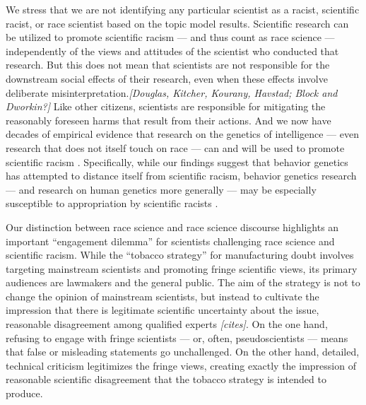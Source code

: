 \documentclass[12pt]{article}
\begin{document}
We stress that we are not identifying any particular scientist as a racist, scientific racist, or race scientist based on the topic model results. Scientific research can be utilized to promote scientific racism --- and thus count as race science --- independently of the views and attitudes of the scientist who conducted that research.\cite{TaberyWhyStudyingGenetics2015, GillbornSoftlySoftlyGenetics2016, CarlsonQuantifyingContextualizingImpact2020, HennWhyDNANo2021} But this does not mean that scientists are not responsible for the downstream social effects of their
research, even when these effects involve deliberate misinterpretation.\emph{{[}Douglas, Kitcher, Kourany, Havstad; Block and Dworkin?{]}} Like other citizens, scientists are responsible for mitigating the reasonably foreseen harms that result from their actions. And we now have decades of empirical evidence that research on the genetics of intelligence --- even research that does not itself touch on race --- can and will be used to promote scientific racism \cite{MeyerWrestlingSocialBehavioral2023}. Specifically, while our findings suggest that behavior genetics has attempted to distance itself from scientific racism, behavior genetics research --- and research on human genetics more generally --- may be especially susceptible to appropriation by scientific racists \cite{CarlsonQuantifyingContextualizingImpact2020, OgbunugaforDNABasketballBirthday2022, *[Harden reviews]*}.

Our distinction between race science and race science discourse highlights an important ``engagement dilemma'' for scientists challenging race science and scientific racism. While the ``tobacco strategy'' for manufacturing doubt involves targeting mainstream scientists and promoting fringe scientific views, its primary audiences are lawmakers and the general public. The aim of the strategy is not to change the opinion of mainstream scientists, but instead to cultivate the impression that there is legitimate scientific uncertainty about the issue, reasonable disagreement among qualified experts \emph{{[}cites{]}}. On the one hand, refusing to engage with fringe scientists --- or, often, pseudoscientists \cite{BhakthavatsalamVirtueEpistemologicalApproach2021} --- means that false or misleading statements go unchallenged. On the other hand, detailed, technical criticism legitimizes the fringe views, creating exactly the impression of reasonable scientific disagreement that the tobacco strategy is intended to produce.
\end{document}

